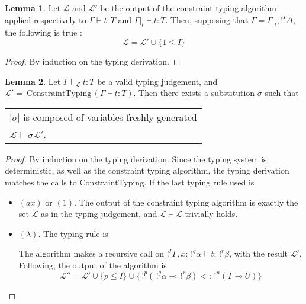 \documentclass[10pt]{article}
\theoremstyle{plain}
\theoremstyle{definition}
\newtheorem{lemma}{Lemma}[section]
\begin{document}
\begin{lemma}
	\label{red-context}
	Let $\mathcal{L}$ and $\mathcal{L'}$ be the output of the constraint typing algorithm applied respectively to
	$\Gamma \vdash t : T$ and $\Gamma |_t \vdash t : T$. Then, supposing that $\Gamma = \Gamma |_t, !^I \Delta$,
	the following is true :
		$$ \mathcal{L} = \mathcal{L'} \cup \{ 1 \le I \} $$
		
	\begin{proof}
		By induction on the typing derivation.
	\end{proof}
\end{lemma}

\begin{lemma}
	\label{incl-set}
	Let $\Gamma \vdash_\mathcal{L} t : T$ be a valid typing judgement, and $\mathcal{L}' = ~\text{ConstraintTyping} \,(\Gamma \vdash t : T)$.
	Then there exists a substitution $\sigma$ such that
		\begin{center}
		\begin{tabular}{l}
			$| \sigma |$ is composed of variables freshly generated \\
			$\mathcal{L} \vdash \sigma \mathcal{L'}$.
		\end{tabular}
		\end{center}
		
	\begin{proof} By induction on the typing derivation. Since the typing system is deterministic, as well as the constraint
		typing algorithm, the typing derivation matches the calls to ConstraintTyping. If the last typing rule used is
		\begin{itemize}
			\item $(ax)$ or $(1)$.
				The output of the constraint typing algorithm is exactly the
				set $\mathcal{L}$ as in the typing judgement, and $\mathcal{L} \vdash \mathcal{L}$ trivially holds.
				
			\item $(\lambda)$. The typing rule is
				\begin{prooftree}
						\RightLabel{$(\lambda)$}
					\end{prooftree}
				The algorithm makes a recursive call on $!^I \Gamma, x : \, !^q \alpha \vdash t : \, !^r\beta$, with the result $\mathcal{L'}$.
				Following, the output of the algorithm is
					$$\mathcal{L''} = \mathcal{L'} \cup \{p \le I \} \cup \{\, !^p (\,!^q\alpha \multimap \,!^r\beta) <: \, !^n (T \multimap U) \}$$
					

\end{itemize}
\end{proof}
\end{lemma}
\end{document}
